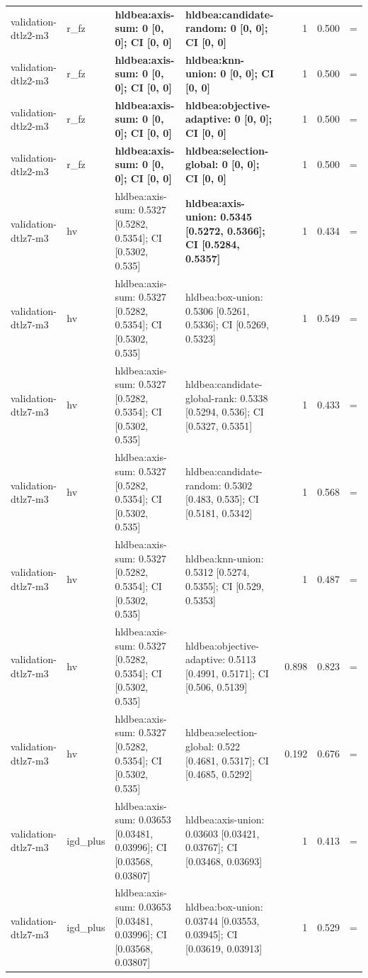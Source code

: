 \begin{tabular}{llllrrc}
validation-dtlz2-m3 & r\_fz & \textbf{hldbea:axis-sum: 0 [0, 0]; CI [0, 0]} & \textbf{hldbea:candidate-random: 0 [0, 0]; CI [0, 0]} & 1 & 0.500 & = \\
validation-dtlz2-m3 & r\_fz & \textbf{hldbea:axis-sum: 0 [0, 0]; CI [0, 0]} & \textbf{hldbea:knn-union: 0 [0, 0]; CI [0, 0]} & 1 & 0.500 & = \\
validation-dtlz2-m3 & r\_fz & \textbf{hldbea:axis-sum: 0 [0, 0]; CI [0, 0]} & \textbf{hldbea:objective-adaptive: 0 [0, 0]; CI [0, 0]} & 1 & 0.500 & = \\
validation-dtlz2-m3 & r\_fz & \textbf{hldbea:axis-sum: 0 [0, 0]; CI [0, 0]} & \textbf{hldbea:selection-global: 0 [0, 0]; CI [0, 0]} & 1 & 0.500 & = \\
validation-dtlz7-m3 & hv & hldbea:axis-sum: 0.5327 [0.5282, 0.5354]; CI [0.5302, 0.535] & \textbf{hldbea:axis-union: 0.5345 [0.5272, 0.5366]; CI [0.5284, 0.5357]} & 1 & 0.434 & = \\
validation-dtlz7-m3 & hv & hldbea:axis-sum: 0.5327 [0.5282, 0.5354]; CI [0.5302, 0.535] & hldbea:box-union: 0.5306 [0.5261, 0.5336]; CI [0.5269, 0.5323] & 1 & 0.549 & = \\
validation-dtlz7-m3 & hv & hldbea:axis-sum: 0.5327 [0.5282, 0.5354]; CI [0.5302, 0.535] & hldbea:candidate-global-rank: 0.5338 [0.5294, 0.536]; CI [0.5327, 0.5351] & 1 & 0.433 & = \\
validation-dtlz7-m3 & hv & hldbea:axis-sum: 0.5327 [0.5282, 0.5354]; CI [0.5302, 0.535] & hldbea:candidate-random: 0.5302 [0.483, 0.535]; CI [0.5181, 0.5342] & 1 & 0.568 & = \\
validation-dtlz7-m3 & hv & hldbea:axis-sum: 0.5327 [0.5282, 0.5354]; CI [0.5302, 0.535] & hldbea:knn-union: 0.5312 [0.5274, 0.5355]; CI [0.529, 0.5353] & 1 & 0.487 & = \\
validation-dtlz7-m3 & hv & hldbea:axis-sum: 0.5327 [0.5282, 0.5354]; CI [0.5302, 0.535] & hldbea:objective-adaptive: 0.5113 [0.4991, 0.5171]; CI [0.506, 0.5139] & 0.898 & 0.823 & = \\
validation-dtlz7-m3 & hv & hldbea:axis-sum: 0.5327 [0.5282, 0.5354]; CI [0.5302, 0.535] & hldbea:selection-global: 0.522 [0.4681, 0.5317]; CI [0.4685, 0.5292] & 0.192 & 0.676 & = \\
validation-dtlz7-m3 & igd\_plus & hldbea:axis-sum: 0.03653 [0.03481, 0.03996]; CI [0.03568, 0.03807] & hldbea:axis-union: 0.03603 [0.03421, 0.03767]; CI [0.03468, 0.03693] & 1 & 0.413 & = \\
validation-dtlz7-m3 & igd\_plus & hldbea:axis-sum: 0.03653 [0.03481, 0.03996]; CI [0.03568, 0.03807] & hldbea:box-union: 0.03744 [0.03553, 0.03945]; CI [0.03619, 0.03913] & 1 & 0.529 & = \\

\end{tabular}
